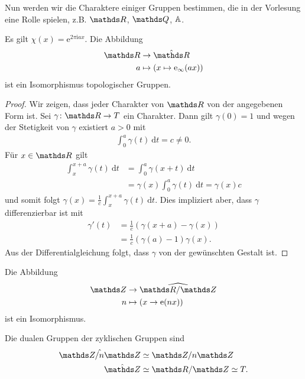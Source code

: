 Nun werden wir die Charaktere einiger Gruppen bestimmen, die in der Vorlesung eine Rolle spielen, z.B. $\R$, $\Q$, $\mathbb{A}$.

\begin{prop}
Es gilt $\chi(x)=\mathrm{e}^{2\pi \mathrm{i}a x}$.
Die Abbildung
\begin{align*}
\R &\to \hat{\R}\\
a&\mapsto (x\mapsto \mathrm{e}_\infty(ax))
\end{align*}
ist ein Isomorphismus topologischer Gruppen.
\end{prop}
\begin{proof}
Wir zeigen, dass jeder Charakter von $\R$ von der angegebenen Form ist.
Sei $\gamma \colon \R \to T$ ein Charakter. Dann gilt $\gamma(0)=1$ und wegen der Stetigkeit von $\gamma$ existiert $a>0$ mit
\begin{align*}
\int_0^a \gamma(t)~\mathrm{d}t=c\not =0.
\end{align*}
Für $x\in \R$ gilt
\begin{align*}
\int_x^{x+a}\gamma(t)~\mathrm{d}t&= \int_0^a\gamma(x+t)~\mathrm{d}t\\
&=\gamma(x)\int_0^a \gamma(t)~\mathrm{d}t=\gamma(x)c
\end{align*}
und somit folgt $\gamma(x)=\frac{1}{c}\int_x^{x+a} \gamma(t)~\mathrm{d}t$.
Dies impliziert aber, dass $\gamma$ differenzierbar ist mit
\begin{align*}
\gamma'(t)&=\frac{1}{c}\left(\gamma(x+a)-\gamma(x)\right)\\
&= \frac{1}{c}(\gamma(a)-1)\gamma(x).
\end{align*}
Aus der Differentialgleichung folgt, dass $\gamma$ von der gewünschten Gestalt ist.
\end{proof}

\begin{prop}
Die Abbildung
\begin{align*}
\Z &\to \widehat{\R/\Z}\\
n &\mapsto (x \to \mathrm{e} (nx))
\end{align*}
ist ein Isomorphismus.
\end{prop}

\begin{prop}
Die dualen Gruppen der zyklischen Gruppen sind
\begin{align*}
\hat{\Z/n\Z} &\simeq \Z/n\Z\\
\hat{\Z} &\simeq \R/\Z \simeq T.
\end{align*}
\end{prop}

